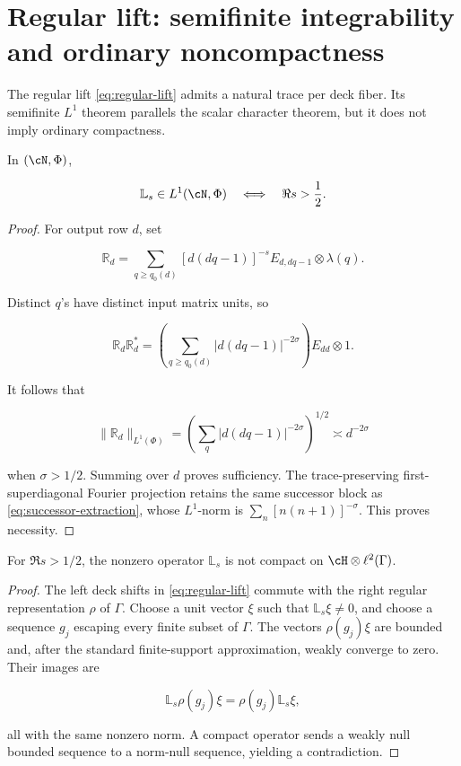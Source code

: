 \section{Regular lift: semifinite integrability and ordinary noncompactness}
\label{sec:lift}

The regular lift \cref{eq:regular-lift} admits a natural trace per deck
fiber.  Its semifinite \(L^1\) theorem parallels the scalar character
theorem, but it does not imply ordinary compactness.

\begin{theorem}
\label{thm:lift-L1}
In \((\cN,\Phi)\),

\begin{equation}
 \mathbb L_s\in L^1(\cN,\Phi)
 \quad\Longleftrightarrow\quad
 \Re s>\frac12.
\label{eq:lift-domain}
\end{equation}
\end{theorem}

\begin{proof}
For output row \(d\), set

\[
 \mathbb R_d=
 \sum_{q\ge q_0(d)}[d(dq-1)]^{-s}
 E_{d,dq-1}\otimes\lambda(q).
\]

Distinct \(q\)'s have distinct input matrix units, so

\[
 \mathbb R_d\mathbb R_d^*
 =\left(\sum_{q\ge q_0(d)}
 |d(dq-1)|^{-2\sigma}\right)E_{dd}\otimes1.
\]

It follows that

\[
 \|\mathbb R_d\|_{L^1(\Phi)}
 =\left(\sum_q|d(dq-1)|^{-2\sigma}\right)^{1/2}
 \asymp d^{-2\sigma}
\]

when \(\sigma>1/2\).  Summing over \(d\) proves sufficiency.  The
trace-preserving first-superdiagonal Fourier projection retains the same
successor block as \cref{eq:successor-extraction}, whose \(L^1\)-norm is
\(\sum_n[n(n+1)]^{-\sigma}\).  This proves necessity.
\end{proof}

\begin{theorem}
\label{thm:lift-noncompact}
For \(\Re s>1/2\), the nonzero operator \(\mathbb L_s\) is not compact on
\(\cH\otimes\ell^2(\Gamma)\).
\end{theorem}

\begin{proof}
The left deck shifts in \cref{eq:regular-lift} commute with the right regular
representation \(\rho\) of \(\Gamma\).  Choose a unit vector \(\xi\) such
that \(\mathbb L_s\xi\ne0\), and choose a sequence \(g_j\) escaping every
finite subset of \(\Gamma\).  The vectors \(\rho(g_j)\xi\) are bounded and,
after the standard finite-support approximation, weakly converge to zero.
Their images are

\[
 \mathbb L_s\rho(g_j)\xi
 =\rho(g_j)\mathbb L_s\xi,
\]

all with the same nonzero norm.  A compact operator sends a weakly null
bounded sequence to a norm-null sequence, yielding a contradiction.
\end{proof}

